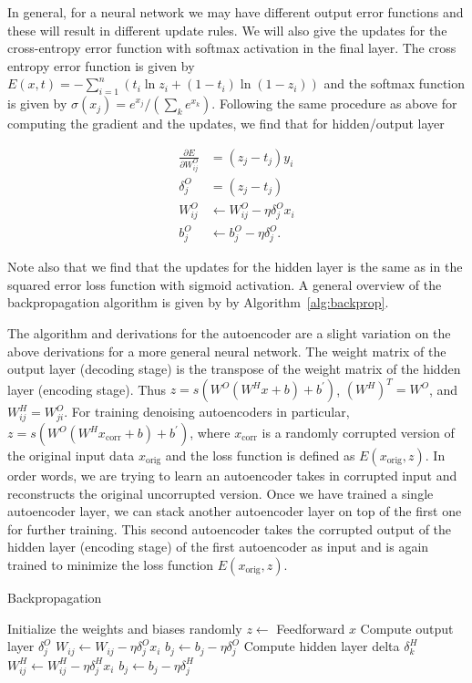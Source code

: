 In general, for a neural network we may have different output error functions and these will result in different update rules. We will also give the updates
for the cross-entropy error function with softmax activation in the final layer.
The cross entropy error function is given by $E(x,t) = -\sum_{i=1}^n \left(t_i\ln z_i + (1-t_i)\ln(1-z_i)\right)$
and the softmax function is given by $\sigma(x_j) = e^{x_j} /(\sum_k e^{x_k})$. Following the same procedure as above
for computing the gradient and the updates, we find that for hidden/output layer

\begin{equation}
\begin{split}
\frac{\partial E}{\partial W^O_{ij}} &= (z_j - t_j)y_i \\
\delta^O_j &= (z_j-t_j) \\
W^O_{ij} &\leftarrow W^O_{ij} - \eta \delta^O_j x_i \\
b^O_j &\leftarrow b^O_j - \eta\delta^O_j.
\end{split}
\end{equation}

Note also that we find that the updates for the hidden layer is the same as in the squared error loss function with sigmoid activation. A general overview of the backpropagation algorithm is given by by Algorithm~\ref{alg:backprop}.

The algorithm and derivations for the autoencoder are a slight variation on the above derivations for a more general neural network. The weight matrix of the output layer (decoding stage) is the transpose of the weight matrix of the hidden layer (encoding stage). Thus $z=s(W^{O}(W^{H}x + b) + b^{'})$, $(W^H)^T = W^O$, and $W^H_{ij} = W^O_{ji}$. For training denoising autoencoders in particular, $z=s(W^{O}(W^{H}x_{\text{corr}} + b) + b^{'})$, where $x_{\text{corr}}$ is a randomly corrupted version of the original input data $x_{\text{orig}}$ and the loss function is defined as $E(x_{\text{orig}}, z)$. In order words, we are trying to learn an autoencoder takes in corrupted input and reconstructs the original uncorrupted version. Once we have trained a single autoencoder layer, we can stack another autoencoder layer on top of the first one for further training. This second autoencoder takes the corrupted output of the hidden layer (encoding stage) of the first autoencoder as input and is again trained to minimize the loss function $E(x_{\text{orig}}, z)$.

\begin{algorithm}[h]
\caption{Backpropagation}
\label{alg:backprop}
\begin{algorithmic}
\STATE Initialize the weights and biases randomly
		\STATE $z\gets$ Feedforward $x$
		\STATE Compute output layer $\delta_j^O$
		\STATE ${W_{ij} \leftarrow W_{ij} - \eta \delta^O_j x_i}$
		\STATE $b_j \leftarrow b_j - \eta\delta^O_j$
			\STATE Compute hidden layer delta $\delta_k^H$
			\STATE ${W^H_{ij} \leftarrow W^H_{ij} - \eta\delta^H_jx_i}$
			\STATE $b_j \leftarrow b_j - \eta\delta^H_j$
		\ENDFOR
	\ENDFOR
\ENDFOR
\end{algorithmic}
\end{algorithm}


